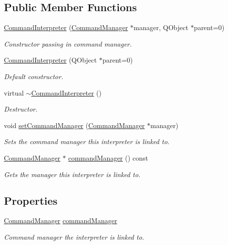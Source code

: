 \subsection*{Public Member Functions}
\begin{DoxyCompactItemize}
\item 
\hyperlink{class_command_interpreter_a2c4a8e2eda99345e3872ce67d7a24b4c}{Command\-Interpreter} (\hyperlink{class_command_manager}{Command\-Manager} $\ast$manager, Q\-Object $\ast$parent=0)
\begin{DoxyCompactList}\small\item\em Constructor passing in command manager. \end{DoxyCompactList}\item 
\hyperlink{class_command_interpreter_aa51298547ce67732b253e2326df57ee9}{Command\-Interpreter} (Q\-Object $\ast$parent=0)
\begin{DoxyCompactList}\small\item\em Default constructor. \end{DoxyCompactList}\item 
\hypertarget{class_command_interpreter_a635c0b6f3edf51ba01f7c63b0dec3d9f}{virtual \hyperlink{class_command_interpreter_a635c0b6f3edf51ba01f7c63b0dec3d9f}{$\sim$\-Command\-Interpreter} ()}\label{class_command_interpreter_a635c0b6f3edf51ba01f7c63b0dec3d9f}

\begin{DoxyCompactList}\small\item\em Destructor. \end{DoxyCompactList}\item 
void \hyperlink{class_command_interpreter_ab09208de80f1c7d13774905df9b6443a}{set\-Command\-Manager} (\hyperlink{class_command_manager}{Command\-Manager} $\ast$manager)
\begin{DoxyCompactList}\small\item\em Sets the command manager this interpreter is linked to. \end{DoxyCompactList}\item 
\hyperlink{class_command_manager}{Command\-Manager} $\ast$ \hyperlink{class_command_interpreter_a04e8516505d0ddf118383ffa1709dccf}{command\-Manager} () const 
\begin{DoxyCompactList}\small\item\em Gets the manager this interpreter is linked to. \end{DoxyCompactList}\end{DoxyCompactItemize}
\subsection*{Properties}
\begin{DoxyCompactItemize}
\item 
\hyperlink{class_command_manager}{Command\-Manager} \hyperlink{class_command_interpreter_a18830cc24516b4ef3f16146996fbc93b}{command\-Manager}
\begin{DoxyCompactList}\small\item\em Command manager the interpreter is linked to. \end{DoxyCompactList}\end{DoxyCompactItemize}


